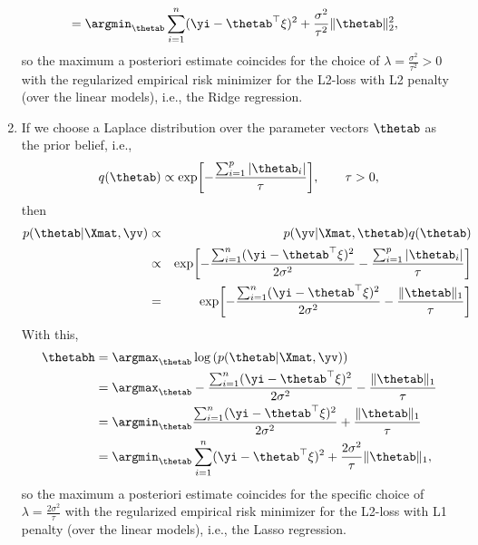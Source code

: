 \begin{enumerate}
\begin{align*}
%  	
  	&= \argmin_{\thetab}   \sum_{i=1}^n (\yi - \thetab^\top \xi)^2  + \frac{\sigma^2}{ \tau^2}  \|\thetab\|_2^2   ,
  \end{align*}
  so the  maximum a posteriori estimate coincides for the choice of $\lambda = \frac{\sigma^2}{ \tau^2}>0$ with the regularized empirical risk minimizer for the L2-loss with L2 penalty (over the linear models), i.e., the Ridge regression.
%  
  \item If we choose a Laplace distribution over the parameter vectors $\thetab$ as the prior belief, i.e.,
%  
	$$  q(\thetab)  \propto  \exp\biggl[-\frac{\sum_{i=1}^p |\thetab_i|}{\tau} \biggr], \qquad \tau>0, $$
	  	then 
%	
	\begin{eqnarray*}
		p(\thetab | \Xmat, \yv) &\propto& p(\yv | \Xmat, \thetab) q(\thetab) \\
		&\propto& \exp\biggl[-\frac{ \sum_{i=1}^n (\yi - \thetab^\top \xi)^2}{2\sigma^2} -\frac{\sum_{i=1}^p |\thetab_i|}{\tau}  \biggr] \\
		&=& \exp\biggl[-\frac{ \sum_{i=1}^n (\yi - \thetab^\top \xi)^2}{2\sigma^2} -\frac{\|\thetab\|_1}{\tau}  \biggr]
	\end{eqnarray*}
	With this, 
	\begin{align*}
		\thetabh 
		&= \argmax_{\thetab} \log \left( p(\thetab | \Xmat, \yv) \right) \\
		&= \argmax_{\thetab} -\frac{ \sum_{i=1}^n (\yi - \thetab^\top \xi)^2}{2\sigma^2} -\frac{\|\thetab\|_1}{\tau}   \\
		&= \argmin_{\thetab}  \frac{ \sum_{i=1}^n (\yi - \thetab^\top \xi)^2}{2\sigma^2} + \frac{\|\thetab\|_1}{\tau}  \\
		&= \argmin_{\thetab}   \sum_{i=1}^n (\yi - \thetab^\top \xi)^2  + \frac{2\sigma^2}{ \tau}  \|\thetab\|_1   ,
	\end{align*}
	so the  maximum a posteriori estimate coincides for the specific choice of $\lambda = \frac{2\sigma^2}{ \tau}$ with the regularized empirical risk minimizer for the L2-loss with L1 penalty (over the linear models), i.e., the Lasso regression.
%	
\end{enumerate}
%
